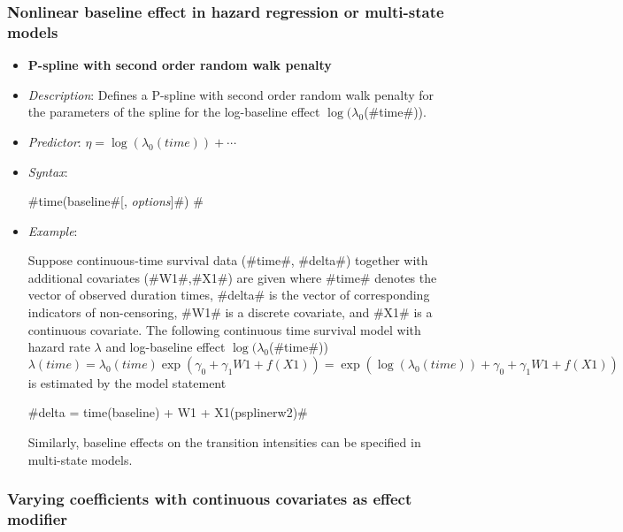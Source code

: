 \subsubsection*{Nonlinear baseline effect in hazard regression or multi-state models}

\begin{itemize}
\item[]{\bf\sffamily P-spline with second order random walk
penalty}

\item[] {\em Description}: Defines a P-spline with second order
random walk penalty for the parameters of the spline for the
log-baseline effect $\log(\lambda_0$(#time#)). \item[] {\em
Predictor}: $\eta = \log(\lambda_0(time)) + \cdots$ \item[] {\em
Syntax}:

#time(baseline#[, {\em options}]#) #
\item[] {\em Example}:

Suppose continuous-time survival data (#time#, #delta#) together
with additional covariates (#W1#,#X1#) are given where #time#
denotes the vector of observed duration times, #delta# is the
vector of corresponding indicators of non-censoring, #W1# is a
discrete covariate, and #X1# is a continuous covariate. The
following continuous time survival model with hazard rate
$\lambda$ and log-baseline effect $\log(\lambda_0$(#time#))
\[
\lambda(time)=\lambda_0(time)\exp (\gamma_0 + \gamma_1 W1 + f(X1)
)=\exp\left(\log(\lambda_0(time)) + \gamma_0 + \gamma_1 W1 +
f(X1)\right)
\]
is estimated by the model statement

#delta = time(baseline) + W1 + X1(psplinerw2)#

Similarly, baseline effects on the transition intensities can be
specified in multi-state models.
\end{itemize}

\subsubsection*{Varying coefficients with continuous covariates as
effect modifier}

